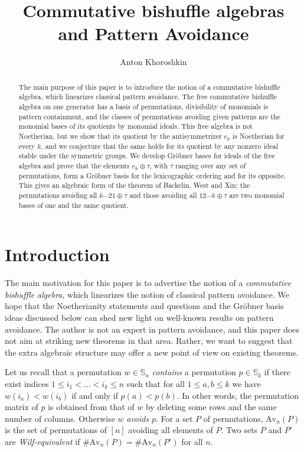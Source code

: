 \documentclass[11pt]{amsart}
\author{Anton Khoroshkin}
\title{Commutative bishuffle algebras and Pattern Avoidance}
\theoremstyle{definition}
\theoremstyle{remark}
\newcommand{\bS}{\mathbb{S}}
\newcommand{\Av}{\mathrm{Av}}
\begin{document}
\begin{abstract}
The main purpose of this paper is to introduce the notion of a commutative bishuffle algebra, which linearizes classical pattern avoidance. The free commutative bishuffle algebra on one generator has a basis of permutations, divisibility of monomials is pattern containment, and the classes of permutations avoiding given patterns are the monomial bases of its quotients by monomial ideals. This free algebra is not Noetherian, but we show that its quotient by the antisymmetrizer $e_k$ is Noetherian for every $k$, and we conjecture that the same holds for its quotient by any nonzero ideal stable under the symmetric groups. We develop Gr\"obner bases for ideals of the free algebra and prove that the elements $e_k\oplus\tau$, with $\tau$ ranging over any set of permutations, form a Gr\"obner basis for the lexicographic ordering and for its opposite. This gives an algebraic form of the theorem of Backelin, West and Xin: the permutations avoiding all $k\cdots21\oplus\tau$ and those avoiding all $12\cdots k\oplus\tau$ are two monomial bases of one and the same quotient.
\end{abstract}

\maketitle

{\small
\tableofcontents
}
\setcounter{section}{-1}

\section{Introduction}

The main motivation for this paper is to advertise the notion of a \emph{commutative bishuffle algebra}, which linearizes the notion of classical pattern avoidance. We hope that the Noetherianity statements and questions and the Gr\"obner basis ideas discussed below can shed new light on well-known results on pattern avoidance. The author is not an expert in pattern avoidance, and this paper does not aim at striking new theorems in that area. Rather, we want to suggest that the extra algebraic structure may offer a new point of view on existing theorems.

Let us recall that a permutation $w\in\bS_n$ \emph{contains} a permutation $p\in\bS_k$ if there exist indices $1\le i_1<\dots<i_k\le n$ such that for all $1\le a,b\le k$ we have $w(i_a)<w(i_b)$ if and only if $p(a)<p(b)$. In other words, the permutation matrix of $p$ is obtained from that of $w$ by deleting some rows and the same number of columns. Otherwise $w$ \emph{avoids} $p$. For a set $P$ of permutations, $\Av_n(P)$ is the set of permutations of $[n]$ avoiding all elements of $P$. Two sets $P$ and $P'$ are \emph{Wilf-equivalent} if $\#\Av_n(P)=\#\Av_n(P')$ for all $n$.
\end{document}
